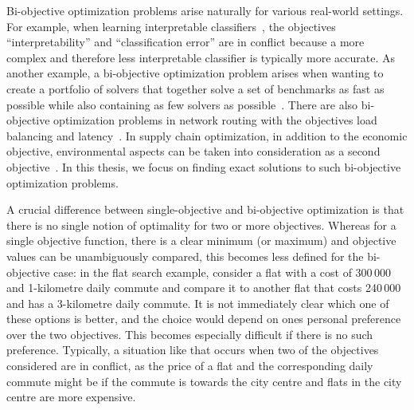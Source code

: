 Bi-objective optimization problems arise naturally for various real-world settings.
For example, when learning interpretable classifiers~\autocites{DBLP:conf/ijcai/Ignatiev0NS21,DBLP:conf/cp/MaliotovM18,DBLP:conf/ijcai/NarodytskaIPM18,DBLP:conf/ijcai/Hu0HH20,DBLP:conf/cp/YuISB20,DBLP:conf/aaai/Ignatiev0S021,DBLP:conf/cade/IgnatievPNM18}, the objectives ``interpretability'' and ``classification error'' are in conflict because a more complex and therefore less interpretable classifier is typically more accurate.
As another example, a bi-objective optimization problem arises when wanting to create a portfolio of solvers that together solve a set of benchmarks as fast as possible while also containing as few solvers as possible~\autocite{DBLP:conf/cp/JanotaMSM21}.
There are also bi-objective optimization problems in network routing with the objectives load balancing and latency~\autocite{SilverioEtAl2022biobjectiveoptimization}.
In supply chain optimization, in addition to the economic objective, environmental aspects can be taken into consideration as a second objective~\autocites{DBLP:journals/cce/Pinto-VarelaBN11,DBLP:journals/candie/TautenhainBN19}.
In this thesis, we focus on finding exact solutions to such bi-objective optimization problems.

A crucial difference between single-objective and bi-objective optimization is that there is no single notion of optimality for two or more objectives.
Whereas for a single objective function, there is a clear minimum (or maximum) and objective values can be unambiguously compared, this becomes less defined for the bi-objective case:
in the flat search example, consider a flat with a cost of 300\,000 \texteuro{} and 1-kilometre daily commute and compare it to another flat that costs 240\,000 \texteuro{} and has a 3-kilometre daily commute.
It is not immediately clear which one of these options is better, and the choice would depend on ones personal preference over the two objectives.
This becomes especially difficult if there is no such preference.
Typically, a situation like that occurs when two of the objectives considered are in conflict, as the price of a flat and the corresponding daily commute might be if the commute is towards the city centre and flats in the city centre are more expensive.


